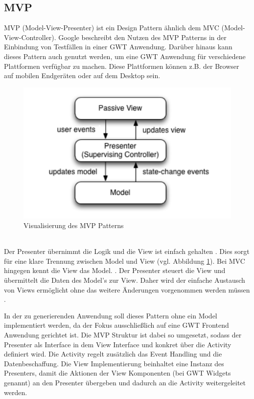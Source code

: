 \subsection*{MVP}
\label{MVP}
MVP (Model-View-Presenter) ist ein Design Pattern ähnlich dem MVC
(Model-View-Controller). Google beschreibt den Nutzen des MVP Patterns in der
Einbindung von Testfällen in einer GWT Anwendung. Darüber hinaus kann dieses
Pattern auch genutzt werden, um eine GWT Anwendung für verschiedene Plattformen
verfügbar zu machen. Diese Plattformen können z.B. der Browser auf mobilen
Endgeräten oder auf dem Desktop sein.
\begin{figure}[htbp]
\begin{center}
\includegraphics{./img/MVP.pdf}
\caption{Visualisierung des MVP Patterns \cite{bib:MVP1}}\label{Fig:MVP}
\end{center}
\end{figure}\\
Der Presenter übernimmt die Logik und die View ist einfach gehalten
\cite{bib:MVP2}. Dies sorgt für eine klare Trennung zwischen Model und View (vgl.
Abbildung \ref{Fig:MVP}). Bei MVC hingegen kennt die View das Model.
\cite{bib:MVCvsMVP}. Der Presenter steuert die View und übermittelt die Daten
des Model's zur View.
Daher wird der einfache Austausch von Views ermöglicht ohne das weitere
Änderungen vorgenommen werden müssen \cite{bib:MVP1}\cite{bib:MVP2}.

In der zu generierenden Anwendung soll dieses Pattern ohne ein Model
implementiert werden, da der Fokus ausschließlich auf eine GWT Frontend
Anwendung gerichtet ist. Die MVP Struktur ist dabei so umgesetzt, sodass der
Presenter als Interface in dem View Interface und konkret über die Activity
definiert wird. Die Activity regelt zusätzlich das Event Handling und die
Datenbeschaffung. Die View Implementierung beinhaltet eine
Instanz des Presenters, damit die Aktionen der View Komponenten
(bei GWT Widgets genannt) an den Presenter übergeben und dadurch an die
Activity weitergeleitet werden.
